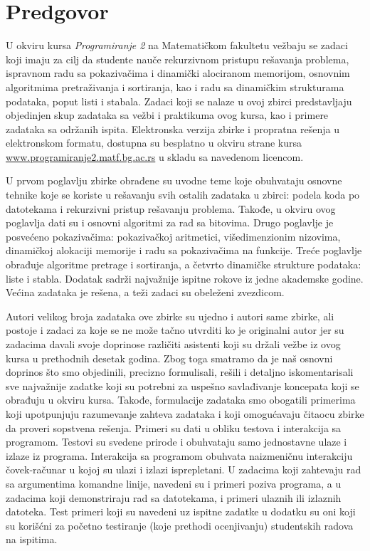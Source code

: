 \chapter*{Predgovor}

U okviru kursa {\em Programiranje 2} na Matematičkom fakultetu vežbaju se zadaci 
koji imaju za cilj da studente nauče rekurzivnom pristupu rešavanja problema, 
ispravnom radu sa pokazivačima i dinamički alociranom memorijom, osnovnim algoritmima 
pretraživanja i sortiranja, kao i radu sa dinamičkim strukturama podataka, 
poput listi i stabala. Zadaci koji se nalaze u ovoj zbirci predstavljaju 
objedinjen skup zadataka sa vežbi i praktikuma ovog kursa, kao i primere 
zadataka sa održanih ispita. 
Elektronska verzija zbirke i propratna rešenja u elektronskom formatu, dostupna su 
besplatno u okviru strane kursa \url{www.programiranje2.matf.bg.ac.rs} u skladu sa navedenom licencom.


U prvom poglavlju zbirke obrađene su uvodne teme koje obuhvataju osnovne tehnike koje se koriste u rešavanju svih ostalih zadataka u zbirci: podela koda po datotekama i rekurzivni pristup rešavanju problema. Takođe, u okviru ovog poglavlja dati su i osnovni algoritmi za rad sa bitovima. Drugo poglavlje je posvećeno pokazivačima: pokazivačkoj aritmetici, višedimenzionim nizovima, dinamičkoj alokaciji memorije i radu sa pokazivačima na funkcije. Treće poglavlje obrađuje algoritme pretrage i sortiranja, a četvrto dinamičke strukture podataka: liste i stabla. Dodatak sadrži najvažnije ispitne rokove iz jedne akademske godine. Većina zadataka je rešena, a teži zadaci su obeleženi zvezdicom.


Autori velikog broja zadataka ove zbirke su ujedno i autori same zbirke, ali postoje 
i zadaci za koje se ne može tačno utvrditi ko je originalni autor jer su zadacima 
davali svoje doprinose različiti asistenti koji su držali vežbe iz ovog kursa u 
prethodnih desetak godina. Zbog toga smatramo da je naš osnovni doprinos 
što smo objedinili, precizno formulisali, rešili i detaljno iskomentarisali 
sve najvažnije zadatke koji su potrebni za uspešno savlađivanje koncepata 
koji se obrađuju u okviru kursa. Takođe, formulacije zadataka smo obogatili
primerima koji upotpunjuju razumevanje zahteva zadataka i koji omogućavaju
čitaocu zbirke da proveri sopstvena rešenja. Primeri su dati u obliku 
testova i interakcija sa programom. Testovi su svedene prirode i obuhvataju 
samo jednostavne ulaze i izlaze iz programa. Interakcija sa programom obuhvata 
naizmeničnu interakciju čovek-računar u kojoj su ulazi i izlazi isprepletani. U zadacima koji zahtevaju rad sa argumentima komandne linije, navedeni su i primeri poziva programa, a u zadacima koji demonstriraju rad sa datotekama, i primeri ulaznih ili izlaznih datoteka. Test primeri koji su navedeni uz ispitne zadatke u dodatku su oni koji su korišćni za 
početno testiranje (koje prethodi ocenjivanju) studentskih radova na ispitima.

